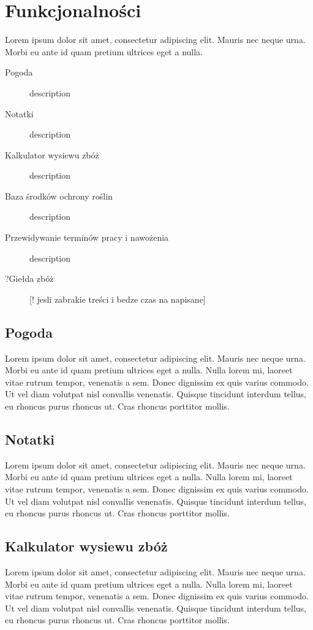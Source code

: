 \documentclass[a4paper,12pt,oneside]{book}
\begin{document}
	\section{Funkcjonalności}
	Lorem ipsum dolor sit amet, consectetur adipiscing elit. Mauris nec neque urna. Morbi eu ante id quam pretium ultrices eget a nulla.
	\begin{description}
		\item[Pogoda] description
		\item[Notatki] description
		\item[Kalkulator wysiewu zbóż] description
		\item[Baza środków ochrony roślin] description
		\item[Przewidywanie terminów pracy i nawożenia] description
		\item[?Giełda zbóż] [! jesli zabrakie treści i bedze czas na napisane]
	\end{description}
	
	\subsection{Pogoda}
		Lorem ipsum dolor sit amet, consectetur adipiscing elit. Mauris nec neque urna. Morbi eu ante id quam pretium ultrices eget a nulla. Nulla lorem mi, laoreet vitae rutrum tempor, venenatis a sem. Donec dignissim ex quis varius commodo. Ut vel diam volutpat nisl convallis venenatis. Quisque tincidunt interdum tellus, eu rhoncus purus rhoncus ut. Cras rhoncus porttitor mollis.
	
	\subsection{Notatki}
		Lorem ipsum dolor sit amet, consectetur adipiscing elit. Mauris nec neque urna. Morbi eu ante id quam pretium ultrices eget a nulla. Nulla lorem mi, laoreet vitae rutrum tempor, venenatis a sem. Donec dignissim ex quis varius commodo. Ut vel diam volutpat nisl convallis venenatis. Quisque tincidunt interdum tellus, eu rhoncus purus rhoncus ut. Cras rhoncus porttitor mollis.
	
	\subsection{Kalkulator wysiewu zbóż}
		Lorem ipsum dolor sit amet, consectetur adipiscing elit. Mauris nec neque urna. Morbi eu ante id quam pretium ultrices eget a nulla. Nulla lorem mi, laoreet vitae rutrum tempor, venenatis a sem. Donec dignissim ex quis varius commodo. Ut vel diam volutpat nisl convallis venenatis. Quisque tincidunt interdum tellus, eu rhoncus purus rhoncus ut. Cras rhoncus porttitor mollis.
	
\end{document}
